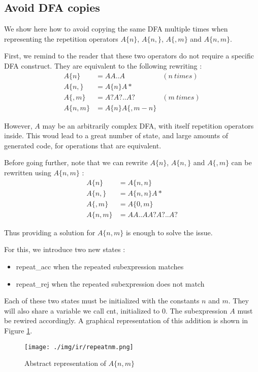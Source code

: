 \documentclass[11pt,a4paper]{report}
\newcommand{\regexp}[1]{$#1$}
\newcommand{\haskell}[1]{\textsf{#1}}
\begin{document}
\subsection{Avoid DFA copies}

We show here how to avoid copying the same DFA multiple times when representing the repetition operators \regexp{A\{n\}}, \regexp{A\{n,\}}, \regexp{A\{,m\}} and \regexp{A\{n,m\}}.

First, we remind to the reader that these two operators do not require a specific DFA construct. They are equivalent to the following rewriting :
\begin{align*}
A\{n\} &= AA..A &(n\ times) \\
A\{n,\} &= A\{n\}A*  \\
A\{,m\} &= A?A?..A? &(m\ times) \\
A\{n,m\} &= A\{n\}A\{,m-n\}
\end{align*}

However, $A$ may be an arbitrarily complex DFA, with itself repetition operators inside. This woud lead to a great number of state, and large amounts of generated code, for operations that are equivalent.

Before going further, note that we can rewrite $A\{n\}$, $A\{n,\}$  and $A\{,m\}$ can be rewritten using $A\{n,m\}$ :
\begin{align*}
A\{n\} &= A\{n,n\} \\
A\{n,\} &= A\{n,n\}A* \\
A\{,m\} &= A\{0,m\} \\
A\{n,m\} &= AA..AA?A?..A?
\end{align*}

Thus providing a solution for \regexp{A\{n,m\}} is enough to solve the issue.

For this, we introduce two new states :
\begin{itemize}
\item \haskell{repeat\_acc} when the repeated subexpression matches
\item \haskell{repeat\_rej} when the repeated subexpression does not match
\end{itemize}

Each of these two states must be initialized with the constants $n$ and $m$. They will also share a variable we call \haskell{cnt}, initialized to $0$. The subexpression $A$ must be rewired accordingly. A graphical representation of this addition is shown in Figure \ref{repeatnmir}.

\begin{figure}[t]
	\centering
	\texttt{[image: ./img/ir/repeatnm.png]}
	\caption{Abstract representation of \regexp{A\{n,m\}}}
	\label{repeatnmir}
\end{figure}
\end{document}
